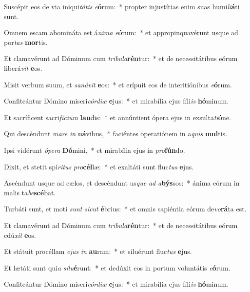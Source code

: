 \item Suscépit eos de via iniqui\textit{tá}\textit{tis} \textit{e}\textbf{ó}rum:~* propter injustítias enim suas humi\textit{li}\textbf{á}ti sunt.
\item Omnem escam abomináta est á\textit{ni}\textit{ma} \textit{e}\textbf{ó}rum:~* et appropinquavérunt usque ad por\textit{tas} \textbf{mor}tis.
\item Et clamavérunt ad Dóminum cum \textit{tri}\textit{bu}\textit{la}\textbf{rén}tur:~* et de necessitátibus eórum liberá\textit{vit} \textbf{e}os.
\item Misit verbum suum, et \textit{sa}\textit{ná}\textit{vit} \textbf{e}os:~* et erípuit eos de interitiónibus \textit{e}\textbf{ó}rum.
\item Confiteántur Dómino miseri\textit{cór}\textit{di}\textit{æ} \textbf{e}jus:~* et mirabília ejus fíli\textit{is} \textbf{hó}minum.
\item Et sacríficent sacri\textit{fí}\textit{ci}\textit{um} \textbf{lau}dis:~* et annúntient ópera ejus in exsulta\textit{ti}\textbf{ó}ne.
\item Qui descéndunt \textit{ma}\textit{re} \textit{in} \textbf{ná}vibus,~* faciéntes operatiónem in a\textit{quis} \textbf{mul}tis.
\item Ipsi vidérunt \textit{ó}\textit{pe}\textit{ra} \textbf{Dó}mini,~* et mirabília ejus in \textit{pro}\textbf{fún}do.
\item Dixit, et stetit spí\textit{ri}\textit{tus} \textit{pro}\textbf{cél}læ:~* et exaltáti sunt fluc\textit{tus} \textbf{e}jus.
\item Ascéndunt usque ad cælos, et descéndunt us\textit{que} \textit{ad} \textit{a}\textbf{býs}sos:~* ánima eórum in malis ta\textit{be}\textbf{scé}bat.
\item Turbáti sunt, et moti \textit{sunt} \textit{sic}\textit{ut} \textbf{é}brius:~* et omnis sapiéntia eórum de\textit{vo}\textbf{rá}ta est.
\item Et clamavérunt ad Dóminum cum \textit{tri}\textit{bu}\textit{la}\textbf{rén}tur:~* et de necessitátibus eórum edú\textit{xit} \textbf{e}os.
\item Et státuit procéllam \textit{e}\textit{jus} \textit{in} \textbf{au}ram:~* et siluérunt fluc\textit{tus} \textbf{e}jus.
\item Et lætáti sunt qui\textit{a} \textit{si}\textit{lu}\textbf{é}runt:~* et dedúxit eos in portum voluntátis \textit{e}\textbf{ó}rum.
\item Confiteántur Dómino miseri\textit{cór}\textit{di}\textit{æ} \textbf{e}jus:~* et mirabília ejus fíli\textit{is} \textbf{hó}minum.
